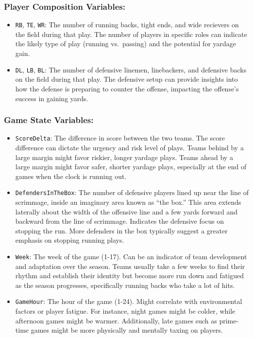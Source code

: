 \documentclass[
  super,
  preprint,
  3p]{elsarticle}
\providecommand{\tightlist}{%
  \setlength{\itemsep}{0pt}\setlength{\parskip}{0pt}}\usepackage{longtable,booktabs,array}
\begin{document}
\hypertarget{player-composition-variables}{%
\subsubsection{Player Composition
Variables:}\label{player-composition-variables}}

\begin{itemize}
\tightlist
\item
  \texttt{RB}, \texttt{TE}, \texttt{WR}: The number of running backs,
  tight ends, and wide recievers on the field during that play. The
  number of players in specific roles can indicate the likely type of
  play (running vs.~passing) and the potential for yardage gain.
\item
  \texttt{DL}, \texttt{LB}, \texttt{BL}: The number of defensive
  linemen, linebackers, and defensive backs on the field during that
  play. The defensive setup can provide insights into how the defense is
  preparing to counter the offense, impacting the offense's success in
  gaining yards.
\end{itemize}

\hypertarget{game-state-variables}{%
\subsubsection{Game State Variables:}\label{game-state-variables}}

\begin{itemize}
\tightlist
\item
  \texttt{ScoreDelta}: The difference in score between the two teams.
  The score difference can dictate the urgency and risk level of plays.
  Teams behind by a large margin might favor riskier, longer yardage
  plays. Teams ahead by a large margin might favor safer, shorter
  yardage plays, especially at the end of games when the clock is
  running out.
\item
  \texttt{DefendersInTheBox}: The number of defensive players lined up
  near the line of scrimmage, inside an imaginary area known as ``the
  box.'' This area extends laterally about the width of the offensive
  line and a few yards forward and backward from the line of scrimmage.
  Indicates the defensive focus on stopping the run. More defenders in
  the box typically suggest a greater emphasis on stopping running
  plays.
\item
  \texttt{Week}: The week of the game (1-17). Can be an indicator of
  team development and adaptation over the season. Teams usually take a
  few weeks to find their rhythm and establish their identity but become
  more run down and fatigued as the season progresses, specifically
  running backs who take a lot of hits.
\item
  \texttt{GameHour}: The hour of the game (1-24). Might correlate with
  environmental factors or player fatigue. For instance, night games
  might be colder, while afternoon games might be warmer. Additionally,
  late games such as prime-time games might be more physically and
  mentally taxing on players.
\end{itemize}
\end{document}

